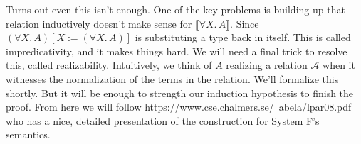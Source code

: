 \documentclass[12pt]{article}
\begin{document}
Turns out even this isn't enough.
One of the key problems is building up that relation inductively doesn't make sense for $\llbracket \forall X.\, A\rrbracket$. 
Since $(\forall X.\, A)[X := (\forall X.\, A)]$ is substituting a type back in itself.
This is called impredicativity, and it makes things hard.
We will need a final trick to resolve this, called realizability.
Intuitively, we think of $A$ realizing a relation $\mathcal{A}$ when it 
witnesses the normalization of the terms in the relation.
We'll formalize this shortly.
But it will be enough to strength our induction hypothesis to finish the proof. 
From here we will follow https://www.cse.chalmers.se/~abela/lpar08.pdf who has a nice, detailed presentation of the construction for System F's semantics.
\end{document}
